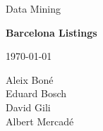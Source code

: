 

\thispagestyle{empty}
\clearpage
\setcounter{page}{-1}

\begin{titlepage}
{
    \centering
    \null
    \vfill
    {\Large Data Mining\par}
    \vspace{2em}
    {\Huge \bfseries
        \airbnb Barcelona Listings
    \par}
    \vspace{2em}
    {\large \scshape
        \today
    \par}
    \vfill
\begin{center}

\end{center}
    \vspace{3cm}

    \vfill
    {\raggedleft \large
Aleix Boné\\
Eduard Bosch\\
David Gili\\
Albert Mercadé
        \par}
}
\end{titlepage}
